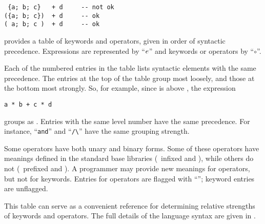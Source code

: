 \begin{small}
\begin{verbatim}
 {a; b; c}   + d     -- not ok
({a; b; c})  + d     -- ok
( a; b; c )  + d     -- ok
\end{verbatim}
\end{small}


 provides a table of keywords and
operators, %
given in order of syntactic precedence.
Expressions are represented
by ``$e\/$'' and keywords or operators by ``$\circ$''.%

Each of the numbered entries in the table lists syntactic elements
with the same precedence.
The entries at the top of the table
group most loosely, and those at the bottom most strongly.
So, for example, since \ttin{+} is above \ttin{*}, the expression

\begin{small}
\begin{verbatim}
a * b + c * d
\end{verbatim}
\end{small}

groups as .
Entries with the same level number have the same precedence.
For instance, ``\verb"and"'' and ``\verb"/\"'' have the same grouping strength.

Some operators have both unary and binary forms.
Some of these operators have meanings defined in the standard base
libraries (\eg{}~infixed \ttin{+} and \ttin{*}), while others do not
(\eg{}~prefixed \ttin{=} and \ttin{+-}).
A programmer may provide new meanings for operators, but not for keywords.
Entries for operators are flagged with ``\dag''; keyword entries are unflagged.

This table can serve as a convenient reference for determining relative
strengths of keywords and operators. 
The full details of the language syntax are given in .




\clearpage

